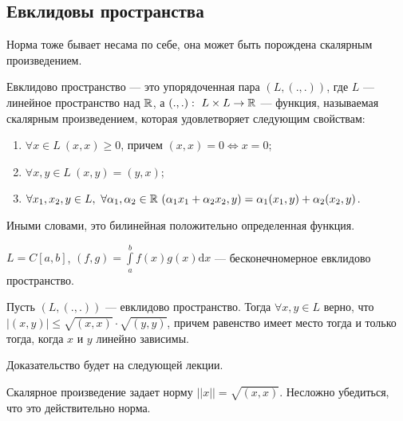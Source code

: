 \subsection{Евклидовы пространства}
Норма тоже бывает несама по себе, она может быть порождена скалярным произведением.
\begin{Def}
Евклидово пространство --- это упорядоченная пара $(L, (., .))$, где $L$ --- линейное пространство над $\mathbb{R}$, а $(., .):\ L\times L \to \mathbb{R}$ --- функция, называемая скалярным произведением, которая удовлетворяет следующим свойствам:
\begin{enumerate}
\item $\forall x \in L\ (x, x) \geq 0$, причем $(x, x) = 0 \Leftrightarrow x = 0$;
\item $\forall x, y\in L\ (x, y) = (y, x)$;
\item $\forall x_1, x_2, y \in L,\ \forall \alpha_1, \alpha_2 \in \mathbb{R}\ (\alpha_1x_1 + \alpha_2x_2, y) = \alpha_1(x_1, y) + \alpha_2(x_2, y)$.
\end{enumerate}
Иными словами, это билинейная положительно определенная функция.
\end{Def}

\begin{Examples}
$L = C[a, b]$, $(f, g) = \int\limits_a^bf(x)g(x)\mathrm{d}x$ --- бесконечномерное евклидово пространство.
\end{Examples}

\begin{Theorem}
Пусть $(L, (., .))$ --- евклидово пространство. Тогда $\forall x, y \in L$ верно, что $|(x, y)| \leq \sqrt{(x, x)}\cdot\sqrt{(y, y)}$, причем равенство имеет место тогда и только тогда, когда $x$ и $y$ линейно зависимы.
\end{Theorem}
Доказательство будет на следующей лекции.

\begin{Statement}
Скалярное произведение задает норму $||x|| = \sqrt{(x, x)}$. Несложно убедиться, что это действительно норма.
\end{Statement}
